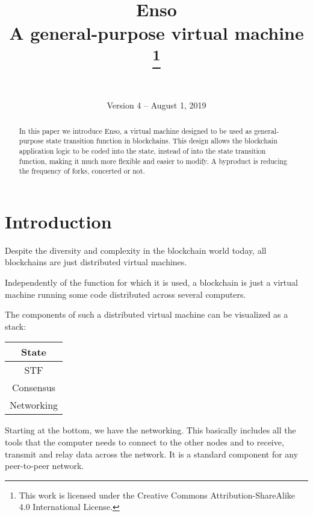 \documentclass[conference]{IEEEtran}
\begin{document}
\title{Enso\\
	\large A general-purpose virtual machine
	\thanks{This work is licensed under the Creative Commons Attribution-ShareAlike 4.0 International License.}
}

\author{
	\\\\Version 4 -- August 1, 2019
}

\maketitle
\thispagestyle{plain} %
\pagestyle{plain} %

\begin{abstract}
In this paper we introduce Enso, a virtual machine designed to be used as general-purpose state transition function in blockchains. This design allows the blockchain application logic to be coded into the state, instead of into the state transition function, making it much more flexible and easier to modify. A byproduct is reducing the frequency of forks, concerted or not.
\end{abstract}

\section{Introduction}
Despite the diversity and complexity in the blockchain world today, all blockchains are just distributed virtual machines.

Independently of the function for which it is used, a blockchain is just a virtual machine running some code distributed across several computers.

The components of such a distributed virtual machine can be visualized as a stack:

\begin{center}
	\begin{tabular}{c}
		State\\
		\hline
		STF\\
		\hline
		Consensus\\
		\hline
		Networking
	\end{tabular}
\end{center}

Starting at the bottom, we have the networking. This basically includes all the tools that the computer needs to connect to the other nodes and to receive, transmit and relay data across the network. It is a standard component for any peer-to-peer network.
\end{document}
